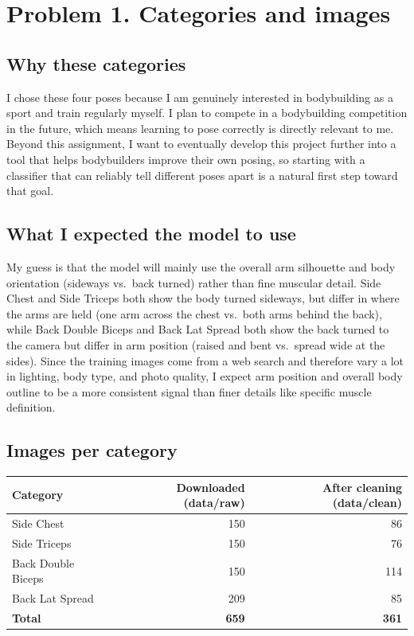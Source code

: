 \documentclass[11pt]{article}
\begin{document}
\makeheader

\section*{Problem 1. Categories and images}

\subsection*{Why these categories}
I chose these four poses because I am genuinely interested in bodybuilding as a sport and train regularly myself. I plan to compete in a bodybuilding competition in the future, which means learning to pose correctly is directly relevant to me. Beyond this assignment, I want to eventually develop this project further into a tool that helps bodybuilders improve their own posing, so starting with a classifier that can reliably tell different poses apart is a natural first step toward that goal.

\subsection*{What I expected the model to use}
My guess is that the model will mainly use the overall arm silhouette and body orientation (sideways vs.\ back turned) rather than fine muscular detail. Side Chest and Side Triceps both show the body turned sideways, but differ in where the arms are held (one arm across the chest vs.\ both arms behind the back), while Back Double Biceps and Back Lat Spread both show the back turned to the camera but differ in arm position (raised and bent vs.\ spread wide at the sides). Since the training images come from a web search and therefore vary a lot in lighting, body type, and photo quality, I expect arm position and overall body outline to be a more consistent signal than finer details like specific muscle definition.

\subsection*{Images per category}
\begin{center}
\begin{tabular}{lrr}
\toprule
Category & Downloaded (data/raw) & After cleaning (data/clean) \\
\midrule
Side Chest & 150 & 86 \\
Side Triceps & 150 & 76 \\
Back Double Biceps & 150 & 114 \\
Back Lat Spread & 209 & 85 \\
\midrule
\textbf{Total} & \textbf{659} & \textbf{361} \\
\bottomrule
\end{tabular}
\end{center}
\end{document}
